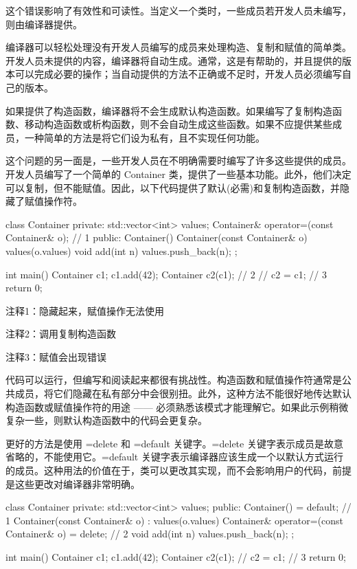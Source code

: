 这个错误影响了有效性和可读性。当定义一个类时，一些成员若开发人员未编写，则由编译器提供。


编译器可以轻松处理没有开发人员编写的成员来处理构造、复制和赋值的简单类。开发人员未提供的内容，编译器将自动生成。通常，这是有帮助的，并且提供的版本可以完成必要的操作；当自动提供的方法不正确或不足时，开发人员必须编写自己的版本。

如果提供了构造函数，编译器将不会生成默认构造函数。如果编写了复制构造函数、移动构造函数或析构函数，则不会自动生成这些函数。如果不应提供某些成员，一种简单的方法是将它们设为私有，且不实现任何功能。

这个问题的另一面是，一些开发人员在不明确需要时编写了许多这些提供的成员。开发人员编写了一个简单的 Container 类，提供了一些基本功能。此外，他们决定可以复制，但不能赋值。因此，以下代码提供了默认(必需)和复制构造函数，并隐藏了赋值操作符。


\begin{cpp}
class Container {
private:
  std::vector<int> values;
  Container& operator=(const Container& o); // 1
public:
  Container() {}
  Container(const Container& o) values(o.values) {}
  void add(int n) { values.push_back(n); }
};

int main() {
  Container c1;
  c1.add(42);
  Container c2(c1); // 2
  // c2 = c1; // 3
  return 0;
}
\end{cpp}

{\footnotesize
注释1：隐藏起来，赋值操作无法使用

注释2：调用复制构造函数

注释3：赋值会出现错误
}


代码可以运行，但编写和阅读起来都很有挑战性。构造函数和赋值操作符通常是公共成员，将它们隐藏在私有部分中会很别扭。此外，这种方法不能很好地传达默认构造函数或赋值操作符的用途 —— 必须熟悉该模式才能理解它。如果此示例稍微复杂一些，则默认构造函数中的代码会更复杂。


更好的方法是使用 =delete 和 =default 关键字。=delete 关键字表示成员是故意省略的，不能使用它。=default 关键字表示编译器应该生成一个以默认方式运行的成员。这种用法的价值在于，类可以更改其实现，而不会影响用户的代码，前提是这些更改对编译器非常明确。


\begin{cpp}
class Container {
private:
  std::vector<int> values;
public:
  Container() = default; // 1
  Container(const Container& o) : values(o.values) {}
  Container& operator=(const Container& o) = delete; // 2
  void add(int n) { values.push_back(n); }
};

int main() {
  Container c1;
  c1.add(42);
  Container c2(c1);
  // c2 = c1; // 3
  return 0;
}
\end{cpp}

